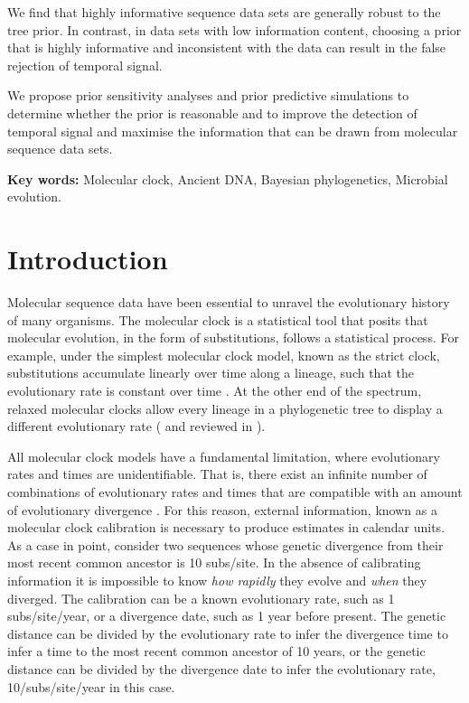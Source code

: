 \documentclass[11pt]{article}
\begin{document}
We find that highly informative sequence data sets are generally robust to the tree prior. In contrast, in data sets with low information content, choosing a prior that is highly informative and inconsistent with the data can result in the false rejection of temporal signal. 

We propose prior sensitivity analyses and prior predictive simulations to determine whether the prior is reasonable and to improve the detection of temporal signal and maximise the information that can be drawn from molecular sequence data sets.

\textbf{Key words:} Molecular clock, Ancient DNA, Bayesian phylogenetics, Microbial evolution.

\section{Introduction}
Molecular sequence data have been essential to unravel the evolutionary history of many organisms. The molecular clock is a statistical tool that posits that molecular evolution, in the form of substitutions, follows a statistical process. For example, under the simplest molecular clock model, known as the strict clock, substitutions accumulate linearly over time along a lineage, such that the evolutionary rate is constant over time \citep{zuckerkandl1965evolutionary}. At the other end of the spectrum, relaxed molecular clocks allow every lineage in a phylogenetic tree to display a different evolutionary rate (\cite{drummond2006relaxed} and reviewed in \citep{ho2014molecular}). 

All molecular clock models have a fundamental limitation, where evolutionary rates and times are unidentifiable. That is, there exist an infinite number of combinations of evolutionary rates and times that are compatible with an amount of evolutionary divergence \citep{yang2006bayesian,dos2013unbearable}. For this reason, external information, known as a molecular clock calibration is necessary to produce estimates in calendar units. As a case in point, consider two sequences whose genetic divergence from their most recent common ancestor is 10 subs/site. In the absence of calibrating information it is impossible to know \textit{how rapidly} they evolve and \textit{when} they diverged. The calibration can be a known evolutionary rate, such as 1 subs/site/year, or a divergence date, such as 1 year before present. The genetic distance can be divided by the evolutionary rate to infer the divergence time to infer a time to the most recent common ancestor of 10 years, or the genetic distance can be divided by the divergence date to infer the evolutionary rate, 10/subs/site/year in this case.
\end{document}
